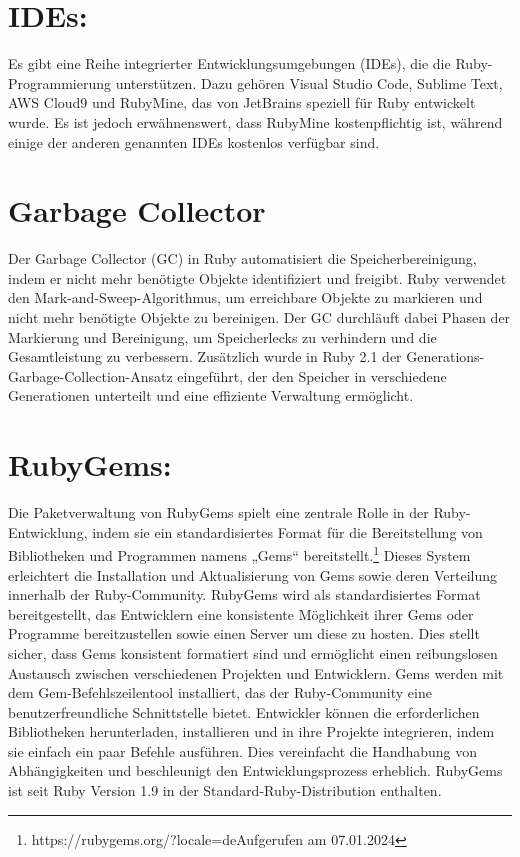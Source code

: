 \documentclass{article}
\begin{document}
\section*{IDEs:}
Es gibt eine Reihe integrierter Entwicklungsumgebungen (IDEs), die die Ruby-Programmierung unterstützen.
Dazu gehören Visual Studio Code, Sublime Text, AWS Cloud9 und RubyMine, das von JetBrains speziell für Ruby entwickelt wurde.
Es ist jedoch erwähnenswert, dass RubyMine kostenpflichtig ist, während einige der anderen genannten IDEs kostenlos verfügbar sind.

\section*{Garbage Collector}
Der Garbage Collector (GC) in Ruby automatisiert die Speicherbereinigung, indem er nicht mehr benötigte Objekte identifiziert und freigibt. Ruby verwendet den Mark-and-Sweep-Algorithmus, um erreichbare Objekte zu markieren und nicht mehr benötigte Objekte zu bereinigen. Der GC durchläuft dabei Phasen der Markierung und Bereinigung, um Speicherlecks zu verhindern und die Gesamtleistung zu verbessern. Zusätzlich wurde in Ruby 2.1 der Generations-Garbage-Collection-Ansatz eingeführt, der den Speicher in verschiedene Generationen unterteilt und eine effiziente Verwaltung ermöglicht.
\section*{RubyGems:}
Die Paketverwaltung von RubyGems  spielt eine zentrale Rolle in der Ruby-Entwicklung, indem sie ein standardisiertes Format für die Bereitstellung von Bibliotheken und Programmen namens „Gems“ bereitstellt.\footnote{https://rubygems.org/?locale=deAufgerufen am 07.01.2024}
 Dieses System erleichtert  die Installation und Aktualisierung von Gems sowie deren Verteilung innerhalb der Ruby-Community.
 RubyGems wird als  standardisiertes Format bereitgestellt, das Entwicklern eine konsistente Möglichkeit ihrer Gems oder Programme bereitzustellen sowie einen Server um diese zu hosten.
 Dies stellt sicher, dass Gems konsistent formatiert sind und ermöglicht einen reibungslosen Austausch zwischen verschiedenen Projekten und Entwicklern.
  Gems werden mit dem Gem-Befehlszeilentool installiert, das der Ruby-Community eine benutzerfreundliche Schnittstelle  bietet.
 Entwickler können  die erforderlichen Bibliotheken herunterladen, installieren und in ihre Projekte integrieren, indem sie einfach ein paar Befehle ausführen.
 Dies vereinfacht die Handhabung von Abhängigkeiten und beschleunigt den Entwicklungsprozess erheblich.
 RubyGems ist seit Ruby Version 1.9  in der Standard-Ruby-Distribution enthalten.
\end{document}
